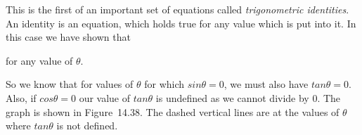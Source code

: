         
        \label{m39414*id89965}This is the first of an important set of equations called \textsl{trigonometric identities}. An identity is an equation, which holds true for any value which is put into it. In this case we have shown that\par 
        \label{m39414*id89978}\nopagebreak\noindent{}
    
        
        \label{m39414*id90014}for any value of \begin{math}\theta \end{math}.\par 
        \label{m39414*id90030}So we know that for values of \begin{math}\theta \end{math} for which \begin{math}sin\theta =0\end{math}, we must also have \begin{math}tan\theta =0\end{math}. Also, if \begin{math}cos\theta =0\end{math} our value of \begin{math}tan\theta \end{math} is undefined as we cannot divide by 0. The graph is shown in Figure~14.38. The dashed vertical lines are at the values of \begin{math}\theta \end{math} where \begin{math}tan\theta \end{math} is not defined.\par 
        
